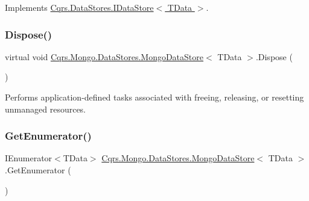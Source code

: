 Implements \hyperlink{interfaceCqrs_1_1DataStores_1_1IDataStore_aa7ade96f2f3151d5353cf7bdbb2baec5_aa7ade96f2f3151d5353cf7bdbb2baec5}{Cqrs.\+Data\+Stores.\+I\+Data\+Store$<$ T\+Data $>$}.

\mbox{\label{classCqrs_1_1Mongo_1_1DataStores_1_1MongoDataStore_a4af729196a5fa4962961c9ce38b74891_a4af729196a5fa4962961c9ce38b74891}} 
\subsubsection{\texorpdfstring{Dispose()}{Dispose()}}
{\footnotesize\ttfamily virtual void \hyperlink{classCqrs_1_1Mongo_1_1DataStores_1_1MongoDataStore}{Cqrs.\+Mongo.\+Data\+Stores.\+Mongo\+Data\+Store}$<$ T\+Data $>$.Dispose (\begin{DoxyParamCaption}{ }\end{DoxyParamCaption})\hspace{0.3cm}{\ttfamily [virtual]}}



Performs application-\/defined tasks associated with freeing, releasing, or resetting unmanaged resources. 

\mbox{\label{classCqrs_1_1Mongo_1_1DataStores_1_1MongoDataStore_a3eeaf3e59a540025ff2aa0f62b5dd465_a3eeaf3e59a540025ff2aa0f62b5dd465}} 
\subsubsection{\texorpdfstring{Get\+Enumerator()}{GetEnumerator()}}
{\footnotesize\ttfamily I\+Enumerator$<$T\+Data$>$ \hyperlink{classCqrs_1_1Mongo_1_1DataStores_1_1MongoDataStore}{Cqrs.\+Mongo.\+Data\+Stores.\+Mongo\+Data\+Store}$<$ T\+Data $>$.Get\+Enumerator (\begin{DoxyParamCaption}{ }\end{DoxyParamCaption})}



